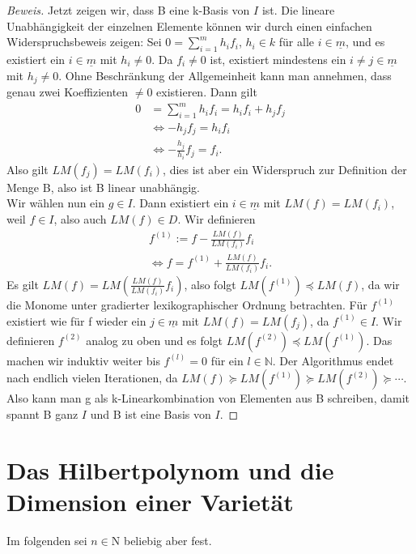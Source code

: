 \documentclass{article}
\begin{document}
\begin{proof}[Beweis]
	Jetzt zeigen wir, dass B eine k-Basis von \(I\) ist. Die lineare Unabhängigkeit der einzelnen 
	Elemente können wir durch einen einfachen Widerspruchsbeweis zeigen:
	Sei \(0 = \sum_{i=1}^{m} h_{i}f_{i}\), \(h_{i} \in k\) für alle \(i \in \underline{m}\),
	und es existiert ein \(i \in \underline{m}\) mit \(h_{i} \neq 0\).
	Da \(f_{i} \neq 0\) ist, existiert mindestens ein \(i \neq j \in \underline
	{m}\) mit \(h_{j} \neq 0\). Ohne Beschränkung der Allgemeinheit kann man annehmen, dass genau
	zwei Koeffizienten \(\neq 0\) existieren. Dann gilt
	\begin{align*}
		0 &= \sum_{i=1}^{m} h_{i}f_{i} = h_{i}f_{i} + h_{j}f_{j} \\
		&\Leftrightarrow -h_{j}f_{j} = h_{i}f_{i} \\
		&\Leftrightarrow -\frac{h_{j}}{h_{i}} f_{j} = f_{i}.
	\end{align*}
	Also gilt \(LM(f_{j}) = LM(f_{i})\), dies ist aber ein Widerspruch zur Definition der Menge B,
	also ist B linear unabhängig. \\
	Wir wählen nun ein \(g \in I\). Dann existiert ein \(i \in \underline{m}\) mit \(LM(f) =
	LM(f_{i})\), weil \(f \in I\), also auch \(LM(f) \in D\). Wir definieren
	\begin{align*}
		f^{(1)} := f - \frac{LM(f)}{LM(f_{i})}f_{i} \\
		\Leftrightarrow f = f^{(1)} + \frac{LM(f)}{LM(f_{i})}f_{i}.
	\end{align*}
	Es gilt \(LM(f) = LM(\frac{LM(f)}{LM(f_{i})}f_{i})\), also folgt \(LM(f^{(1)}) \preceq LM(f)\),
	da wir die Monome unter gradierter lexikographischer Ordnung betrachten.
	Für \(f^{(1)}\) existiert wie für f wieder ein \(j \in \underline{m}\) mit \(LM(f) =
	LM(f_{j})\), da \(f^{(1)} \in I\). Wir definieren \(f^{(2)}\) analog zu oben und es
	folgt \(LM(f^{(2)}) \preceq LM(f^{(1)})\). Das machen wir induktiv weiter bis \(f^{(l)} = 0\)  
	für ein \(l \in \mathbb{N}\).
	Der Algorithmus endet nach endlich vielen Iterationen, da \(LM(f) \succeq LM(f^{(1)}) \succeq LM(f^{(2)}) \succeq \cdots\).
	Also kann man g als k-Linearkombination von Elementen aus B schreiben, damit spannt B ganz \(I\) und B ist eine Basis von \(I\).
	\end{proof}

\section{Das Hilbertpolynom und die Dimension einer Varietät}

Im folgenden sei $n \in \mathrm{N}$ beliebig aber fest.
\end{document}
